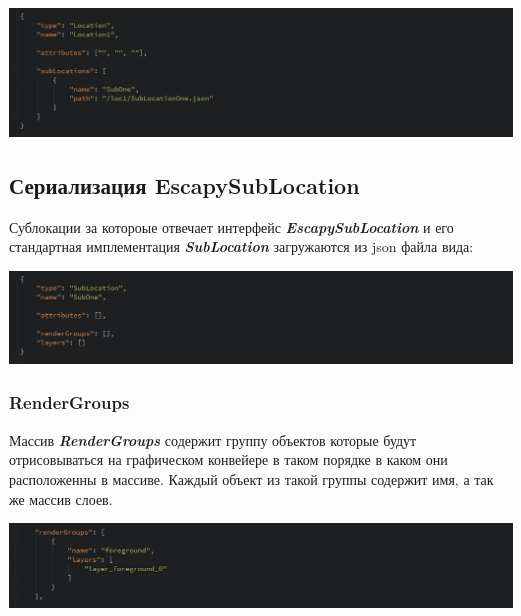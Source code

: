 \documentclass[11pt]{report}
\begin{document}
\begin{center}
	\includegraphics[width=1.2\linewidth]{img/17.png} 
  	\label{img:170} 
\end{center} 

\subsection{Сериализация EscapySubLocation}
Сублокации за котороые отвечает интерфейс \textit{\textbf{EscapySubLocation}} и его стандартная имплементация \textit{\textbf{SubLocation}} загружаются из json файла вида:
\begin{center}
	\includegraphics[width=1.2\linewidth]{img/18.png} 
  	\label{img:180} 
\end{center} 
\subsubsection{RenderGroups}
Массив \textit{\textbf{RenderGroups}} содержит группу объектов которые будут отрисовываться на графическом конвейере в таком порядке в каком они расположенны в массиве. Каждый объект из такой группы содержит имя, а так же массив слоев.
\begin{center}
	\includegraphics[width=1.2\linewidth]{img/19.png} 
  	\label{img:190} 
\end{center} 
\end{document}
